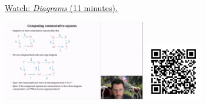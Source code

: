 
\begin{minipage}{10cm}
    \href{https://act4e-spring21.netlify.app/videos/spring2021-nat-trafos:diagrams.html}{Watch: \emph{Diagrams} (11 minutes).}
        
    \href{https://act4e-spring21.netlify.app/videos/spring2021-nat-trafos:diagrams.html}{\includegraphics[height=3.5cm]{spring2021-nat-trafos:diagrams/thumbnails.jpg}}
    \href{https://act4e-spring21.netlify.app/videos/spring2021-nat-trafos:diagrams.html}{\includegraphics[height=2.5cm]{spring2021-nat-trafos:diagrams/qrcode.png}}
\end{minipage}
